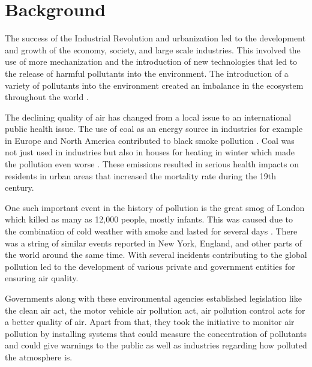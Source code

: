  \section{Background}

 The success of the Industrial Revolution and urbanization led to the development and growth of the economy, society, and large scale industries. This involved the use of more mechanization and the introduction of new technologies that led to the release of harmful pollutants into the environment. The introduction of a variety of pollutants into the environment created an imbalance in the ecosystem throughout the world \cite{manisalidis2020environmental}.
 
 The declining quality of air has changed from a local issue to an international public health issue. The use of coal as an energy source in industries for example in Europe and North America contributed to black smoke pollution \cite{heidorn1978chronology}. Coal was not just used in industries but also in houses for heating in winter which made the pollution even worse \cite{Al2016}. These emissions resulted in serious health impacts on residents in urban areas that increased the mortality rate during the 19th century. 
 \par
 One such important event in the history of pollution is the great smog of London which killed as many as 12,000 people, mostly infants. This was caused due to the combination of cold weather with smoke and lasted for several days \cite{wilkins1954air}. There was a string of similar events reported in New York, England, and other parts of the world around the same time. With several incidents contributing to the global pollution led to the development of various private and government entities for ensuring air quality. 
 
 Governments along with these environmental agencies established legislation like the clean air act, the motor vehicle air pollution act, air pollution control acts for a better quality of air. Apart from that, they took the initiative to monitor air pollution by installing systems that could measure the concentration of pollutants and could give warnings to the public as well as industries regarding how polluted the atmosphere is.
 
